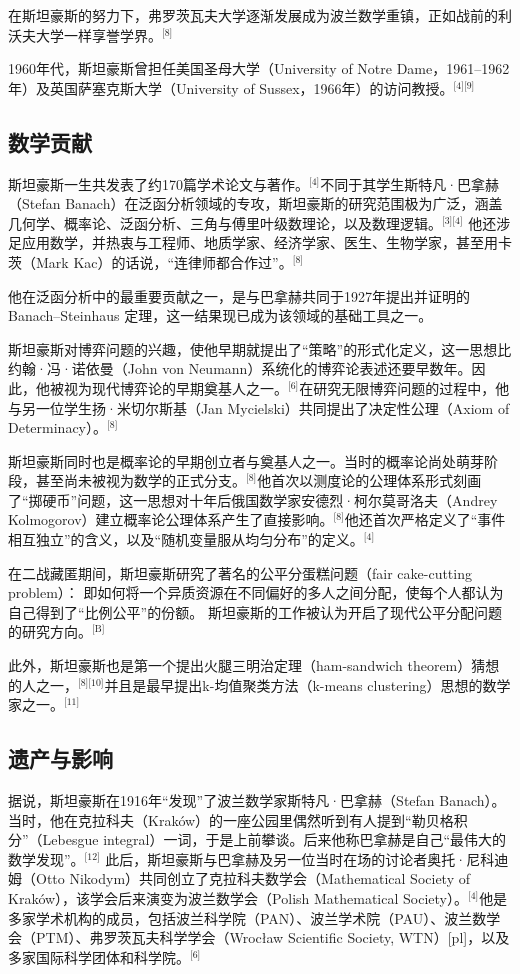 在斯坦豪斯的努力下，弗罗茨瓦夫大学逐渐发展成为波兰数学重镇，正如战前的利沃夫大学一样享誉学界。\(^\text{[8]}\)

1960年代，斯坦豪斯曾担任美国圣母大学（University of Notre Dame，1961–1962年）及英国萨塞克斯大学（University of Sussex，1966年）的访问教授。\(^\text{[4][9]}\)
\subsection{数学贡献}
斯坦豪斯一生共发表了约170篇学术论文与著作。\(^\text{[4]}\)不同于其学生斯特凡·巴拿赫（Stefan Banach）在泛函分析领域的专攻，斯坦豪斯的研究范围极为广泛，涵盖几何学、概率论、泛函分析、三角与傅里叶级数理论，以及数理逻辑。\(^\text{[3][4]}\)  他还涉足应用数学，并热衷与工程师、地质学家、经济学家、医生、生物学家，甚至用卡茨（Mark Kac）的话说，“连律师都合作过”。\(^\text{[8]}\)

他在泛函分析中的最重要贡献之一，是与巴拿赫共同于1927年提出并证明的Banach–Steinhaus 定理，这一结果现已成为该领域的基础工具之一。

斯坦豪斯对博弈问题的兴趣，使他早期就提出了“策略”的形式化定义，这一思想比约翰·冯·诺依曼（John von Neumann）系统化的博弈论表述还要早数年。因此，他被视为现代博弈论的早期奠基人之一。\(^\text{[6]}\)在研究无限博弈问题的过程中，他与另一位学生扬·米切尔斯基（Jan Mycielski）共同提出了决定性公理（Axiom of Determinacy）。\(^\text{[8]}\)

斯坦豪斯同时也是概率论的早期创立者与奠基人之一。当时的概率论尚处萌芽阶段，甚至尚未被视为数学的正式分支。\(^\text{[8]}\)他首次以测度论的公理体系形式刻画了“掷硬币”问题，这一思想对十年后俄国数学家安德烈·柯尔莫哥洛夫（Andrey Kolmogorov）建立概率论公理体系产生了直接影响。\(^\text{[8]}\)他还首次严格定义了“事件相互独立”的含义，以及“随机变量服从均匀分布”的定义。\(^\text{[4]}\)

在二战藏匿期间，斯坦豪斯研究了著名的公平分蛋糕问题（fair cake-cutting problem）：  即如何将一个异质资源在不同偏好的多人之间分配，使每个人都认为自己得到了“比例公平”的份额。  斯坦豪斯的工作被认为开启了现代公平分配问题的研究方向。\(^\text{[B]}\)

此外，斯坦豪斯也是第一个提出火腿三明治定理（ham-sandwich theorem）猜想的人之一，\(^\text{[8][10]}\)并且是最早提出k-均值聚类方法（k-means clustering）思想的数学家之一。\(^\text{[11]}\)
\subsection{遗产与影响}
据说，斯坦豪斯在1916年“发现”了波兰数学家斯特凡·巴拿赫（Stefan Banach）。当时，他在克拉科夫（Kraków）的一座公园里偶然听到有人提到“勒贝格积分”（Lebesgue integral）一词，于是上前攀谈。后来他称巴拿赫是自己“最伟大的数学发现”。\(^\text{[12]}\) 此后，斯坦豪斯与巴拿赫及另一位当时在场的讨论者奥托·尼科迪姆（Otto Nikodym）共同创立了克拉科夫数学会（Mathematical Society of Kraków），该学会后来演变为波兰数学会（Polish Mathematical Society）。\(^\text{[4]}\)他是多家学术机构的成员，包括波兰科学院（PAN）、波兰学术院（PAU）、波兰数学会（PTM）、弗罗茨瓦夫科学学会（Wrocław Scientific Society, WTN）[pl]，以及多家国际科学团体和科学院。\(^\text{[6]}\)

